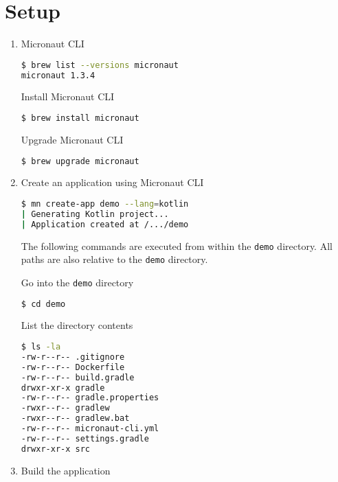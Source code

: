 \section{Setup}\label{sec:setup}

\begin{enumerate}

\item Micronaut CLI

\begin{lstlisting}[language=bash]
$ brew list --versions micronaut
micronaut 1.3.4
\end{lstlisting}

Install Micronaut CLI

\begin{lstlisting}[language=bash]
$ brew install micronaut
\end{lstlisting}

Upgrade Micronaut CLI

\begin{lstlisting}[language=bash]
$ brew upgrade micronaut
\end{lstlisting}

\item Create an application using Micronaut CLI

\begin{lstlisting}[language=bash]
$ mn create-app demo --lang=kotlin
| Generating Kotlin project...
| Application created at /.../demo
\end{lstlisting}

The following commands are executed from within the \texttt{demo} directory.  All paths are also relative to the \texttt{demo} directory.

Go into the \texttt{demo} directory

\begin{lstlisting}[language=bash]
$ cd demo
\end{lstlisting}

List the directory contents

\begin{lstlisting}[language=bash]
$ ls -la
-rw-r--r-- .gitignore
-rw-r--r-- Dockerfile
-rw-r--r-- build.gradle
drwxr-xr-x gradle
-rw-r--r-- gradle.properties
-rwxr--r-- gradlew
-rwxr--r-- gradlew.bat
-rw-r--r-- micronaut-cli.yml
-rw-r--r-- settings.gradle
drwxr-xr-x src
\end{lstlisting}

\item Build the application


\end{enumerate}

